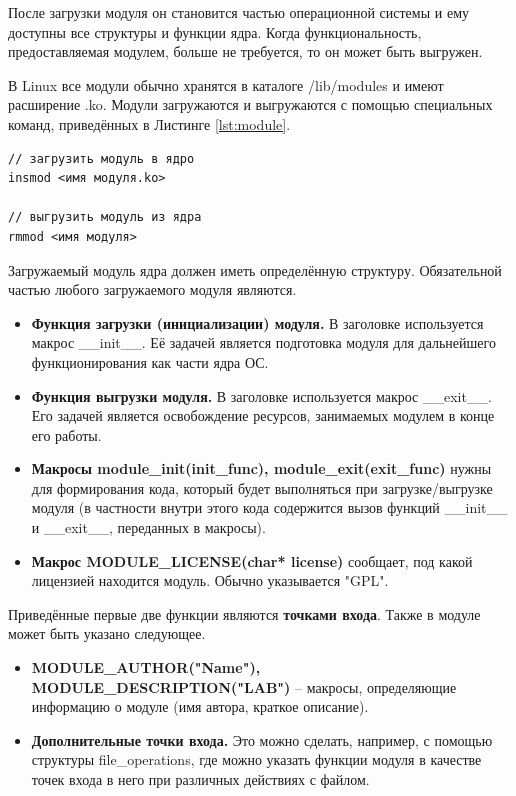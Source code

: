 После загрузки модуля он становится частью операционной системы и ему доступны все структуры и функции ядра. Когда функциональность, предоставляемая модулем, больше не требуется, то он может быть выгружен.

В Linux все модули обычно хранятся в каталоге /lib/modules и имеют расширение .ko. Модули загружаются и выгружаются с помощью специальных команд, приведённых в Листинге \ref{lst:module}.

\begin{lstlisting}[caption = {Команды для загрузки и выгрузки загружаемого модуля ядра}, label=lst:module]
// загрузить модуль в ядро
insmod <имя модуля.ko>
		
// выгрузить модуль из ядра
rmmod <имя модуля>
\end{lstlisting}

Загружаемый модуль ядра должен иметь определённую структуру. Обязательной частью любого загружаемого модуля являются.
\begin{itemize}
	\item \textbf{Функция загрузки (инициализации) модуля.} В заголовке используется макрос \_\_init\_\_. Её задачей является подготовка модуля для дальнейшего функционирования как части ядра ОС.
	
	\item \textbf{Функция выгрузки модуля.} В заголовке используется макрос \_\_exit\_\_. Его задачей является освобождение ресурсов, занимаемых модулем в конце его работы. 
	
	\item \textbf{Макросы module\_init(init\_func), module\_exit(exit\_func)} нужны для формирования кода, который будет выполняться при загрузке/выгрузке модуля (в частности внутри этого кода содержится вызов функций \_\_init\_\_ и \_\_exit\_\_, переданных в макросы).
	
	\item \textbf{Макрос MODULE\_LICENSE(char* license)} сообщает, под какой лицензией находится модуль. Обычно указывается "GPL".
\end{itemize}
Приведённые первые две функции являются \textbf{точками входа}. Также в модуле может быть указано следующее.
\begin{itemize}
	\item \textbf{MODULE\_AUTHOR("Name"), MODULE\_DESCRIPTION("LAB")} -- макросы, определяющие информацию о модуле (имя автора, краткое описание).
	
	\item \textbf{Дополнительные точки входа.} Это можно сделать, например, с помощью структуры file\_operations, где можно указать функции модуля в качестве точек входа в него при различных действиях с файлом. \newline
\end{itemize}

